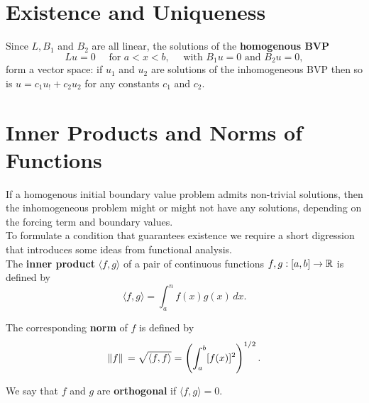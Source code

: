 \section{Existence and Uniqueness}
Since \(L, B_1\) and \(B_2\) are all linear, the solutions of the \textbf{homogenous BVP}
\[Lu = 0 \quad \text{ for } a < x < b, \quad \text{ with } B_1u = 0 \text{ and } B_2u = 0,\]
form a vector space: if \(u_1\) and \(u_2\) are solutions of the inhomogeneous BVP then so is \(u = c_1u_! + c_2u_2\) for any constants \(c_1\) and \(c_2\).



\section{Inner Products and Norms of Functions}
If a homogenous initial boundary value problem admits non-trivial solutions, then the inhomogeneous problem might or might not have any solutions, depending on the forcing term and boundary values. \\

To formulate a condition that guarantees existence we require a short digression that introduces some ideas from functional analysis. \\

The \textbf{inner product} \(\langle f, g \rangle\) of a pair of continuous functions \(f, g : [a, b] \to \mathbb{R}\) is defined by
\[\langle f, g \rangle = \int_a^n f(x)g(x) \, dx.\]

The corresponding \textbf{norm} of \(f\) is defined by
\[\norm*{f} = \sqrt{\langle f, f \rangle} = \left(\int_{a}^{b}[f(x)]^2\right)^{1/2}.\]

We say that \(f\) and \(g\) are \textbf{orthogonal} if \(\langle f, g \rangle = 0\).


